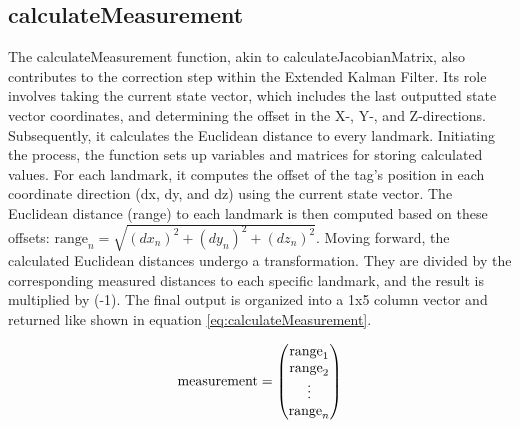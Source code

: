 \subsection{calculateMeasurement}
\label{sub:calculateMeasurement}
The calculateMeasurement function, akin to calculateJacobianMatrix, also contributes to the correction step within the Extended Kalman Filter. 
Its role involves taking the current state vector, which includes the last outputted state vector coordinates, and determining the offset in the X-, Y-, and Z-directions. Subsequently, it calculates the Euclidean distance to every landmark.
\vspace{4pt}
\newline
Initiating the process, the function sets up variables and matrices for storing calculated values. For each landmark, it computes the offset of the tag's position in each coordinate direction (dx, dy, and dz) using the current state vector. The Euclidean distance (range) to each landmark is then computed based on these offsets:
$\textrm{range}_n = \sqrt{(dx_n)^2 + (dy_n)^2 + (dz_n)^2}$.
Moving forward, the calculated Euclidean distances undergo a transformation. They are divided by the corresponding measured distances to each specific landmark, and the result is multiplied by (-1). The final output is organized into a 1x5 column vector and returned like shown in equation \ref{eq:calculateMeasurement}. 

\begin{equation}
\begin{centering}
	\textrm{measurement} =
	\begin{pmatrix}
		\textrm{range}_1 \\
		\textrm{range}_2 \\
		\vdots \\
		\textrm{range}_n 
	\end{pmatrix}
\end{centering}
\label{eq:calculateMeasurement}
\end{equation}

